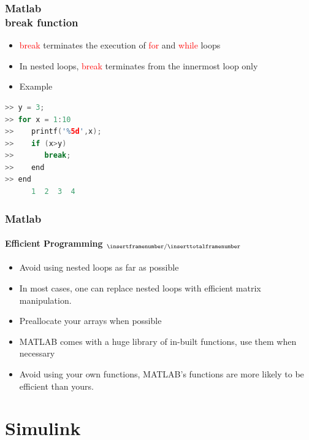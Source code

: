 \documentclass[hyperref={pdfpagelabels=true}]{beamer}
\begin{document}
\begin{frame}[fragile]
\frametitle{Matlab \\ {\small break function}}
\begin{itemize}
\item[\ding{63}] \textcolor{red}{break} terminates the execution of \textcolor{red}{for} and \textcolor{red}{while} loops
\item[\ding{63}] In nested loops, \textcolor{red}{break} terminates from the innermost loop only
\end{itemize}

\begin{itemize}
\item[\ding{64}] Example
\end{itemize}
\begin{lstlisting}[language=C++,basicstyle=\ttfamily,keywordstyle=\color{red}]
>> y = 3;
>> for x = 1:10
>>    printf('%5d',x);
>>    if (x>y)
>>       break;
>>    end
>> end
      1  2  3  4
\end{lstlisting}
\end{frame}



\begin{frame}
\frametitle{Matlab}
\framesubtitle{Efficient Programming $_{\tiny \insertframenumber/\inserttotalframenumber}$}
\begin{itemize}
\item Avoid using nested loops as far as possible
\item In most cases, one can replace nested loops with efficient matrix
manipulation.
\item Preallocate your arrays when possible
\item MATLAB comes with a huge library of in-built functions, use them
when necessary
\item Avoid using your own functions, MATLAB’s functions are more likely
to be efficient than yours.
\end{itemize}
\end{frame}





\section{Simulink}
\end{document}
